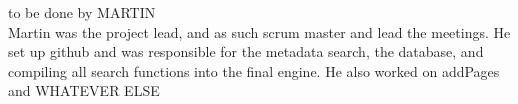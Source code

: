 to be done by MARTIN\\
Martin was the project lead, and as such scrum master and lead the meetings. He set up github and was responsible for the  metadata search, the database, and compiling all search functions into the final engine. He also worked on addPages and WHATEVER ELSE
